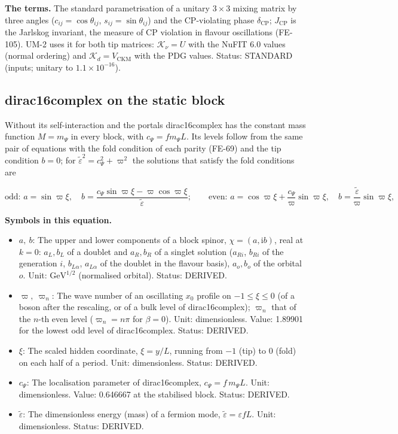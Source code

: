 \documentclass[
  10pt,
]{article}
\providecommand{\tightlist}{%
  \setlength{\itemsep}{0pt}\setlength{\parskip}{0pt}}
\begin{document}
\textbf{The terms.} The standard parametrisation of a unitary
\(3 \times 3\) mixing matrix by three angles
(\(c_{ij} = \cos\theta_{ij}\), \(s_{ij} = \sin\theta_{ij}\)) and the
CP-violating phase \(\delta_{\mathrm{CP}}\); \(J_{\mathrm{CP}}\) is the
Jarlskog invariant, the measure of CP violation in flavour oscillations
(FE-105). UM-2 uses it for both tip matrices: \(\mathcal{K}_\nu = U\)
with the NuFIT 6.0 values (normal ordering) and
\(\mathcal{K}_d = V_{\mathrm{CKM}}\) with the PDG values. Status:
STANDARD (inputs; unitary to \(1.1\times10^{-16}\)).

\hypertarget{dirac16complex-on-the-static-block}{%
\subsection{dirac16complex on the static
block}\label{dirac16complex-on-the-static-block}}

Without its self-interaction and the portals dirac16complex has the
constant mass function \(M = m_\Psi\) in every block, with
\(c_\Psi = fm_\Psi L\). Its levels follow from the same pair of
equations with the fold condition of each parity (FE-69) and the tip
condition \(b = 0\); for \(\tilde\varepsilon^2 = c_\Psi^2 + \varpi^2\)
the solutions that satisfy the fold conditions are

\[
\text{odd: } a = \sin\varpi\xi,\quad b = \frac{c_\Psi\sin\varpi\xi - \varpi\cos\varpi\xi}{\tilde\varepsilon};\qquad
\text{even: } a = \cos\varpi\xi + \frac{c_\Psi}{\varpi}\sin\varpi\xi,\quad b = \frac{\tilde\varepsilon}{\varpi}\sin\varpi\xi,
\]

\textbf{Symbols in this equation.}

\begin{itemize}
\tightlist
\item
  \(a,\ b\): The upper and lower components of a block spinor,
  \(\chi = (a, \mathrm{i}b)\), real at \(k = 0\): \(a_L, b_L\) of a
  doublet and \(a_R, b_R\) of a singlet solution (\(a_{Ri}\), \(b_{Ri}\)
  of the generation \(i\), \(b_{L\alpha}\), \(a_{L\alpha}\) of the
  doublet in the flavour basis), \(a_o, b_o\) of the orbital \(o\).
  Unit: \(\mathrm{GeV}^{1/2}\) (normalised orbital). Status: DERIVED.
\item
  \(\varpi,\ \varpi_n\): The wave number of an oscillating \(x_0\)
  profile on \(-1 \le \xi \le 0\) (of a boson after the rescaling, or of
  a bulk level of dirac16complex); \(\varpi_n\) that of the \(n\)-th
  even level (\(\varpi_n = n\pi\) for \(\beta = 0\)). Unit:
  dimensionless. Value: 1.89901 for the lowest odd level of
  dirac16complex. Status: DERIVED.
\item
  \(\xi\): The scaled hidden coordinate, \(\xi = y/L\), running from
  \(-1\) (tip) to \(0\) (fold) on each half of a period. Unit:
  dimensionless. Status: DERIVED.
\item
  \(c_\Psi\): The localisation parameter of dirac16complex,
  \(c_\Psi = f\,m_\Psi L\). Unit: dimensionless. Value: 0.646667 at the
  stabilised block. Status: DERIVED.
\item
  \(\tilde\varepsilon\): The dimensionless energy (mass) of a fermion
  mode, \(\tilde\varepsilon = \varepsilon fL\). Unit: dimensionless.
  Status: DERIVED.
\end{itemize}
\end{document}
